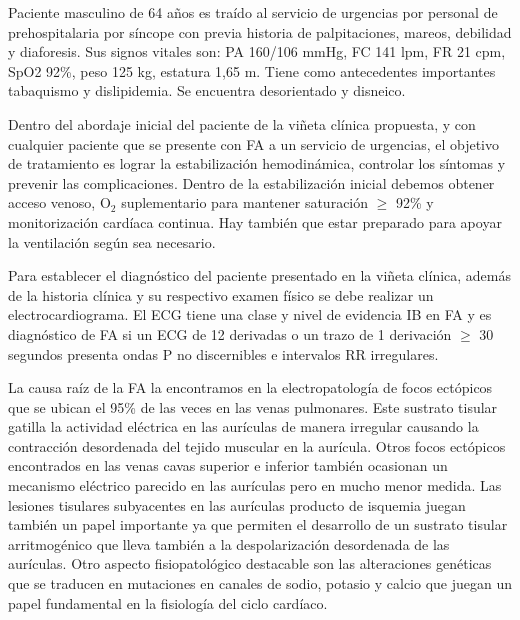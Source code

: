 \documentclass[a4paper]{article}
\let\cite=\supercite
\begin{document}
\begin{multicols}{3}
\begin{boxClinica}

Paciente masculino de 64 años es traído al servicio de urgencias por personal
de prehospitalaria por síncope con previa historia de palpitaciones, mareos,
debilidad y diaforesis. Sus signos vitales son: PA 160/106 mmHg, FC 141 lpm,
FR 21 cpm, SpO2 92\%, peso 125 kg, estatura 1,65 m. Tiene como antecedentes
importantes tabaquismo y dislipidemia. Se encuentra desorientado y disneico.

\end{boxClinica}

Dentro del abordaje inicial del paciente de la viñeta clínica propuesta, y con
cualquier paciente que se presente con FA a un servicio de urgencias,
el objetivo de tratamiento es lograr la estabilización hemodinámica,
controlar los síntomas y prevenir las complicaciones. Dentro de la
estabilización inicial debemos obtener acceso venoso, O$_{\text{2}}$
suplementario para mantener saturación $\geq$ 92\% y monitorización cardíaca
continua. Hay también que estar preparado para apoyar la ventilación según
sea necesario.

Para establecer el diagnóstico del paciente presentado en la viñeta clínica,
además de la historia clínica y su respectivo examen físico se debe realizar un
electrocardiograma. El ECG tiene una clase y nivel de evidencia IB en FA y es
diagnóstico de FA si un ECG de 12 derivadas o un trazo de 1 derivación
$\geq$ 30 segundos presenta ondas P no discernibles e intervalos RR
irregulares\cite{guiaesc_2021}.

La causa raíz de la FA la encontramos en la electropatología de focos ectópicos
que se ubican el 95\% de las veces en las venas pulmonares. Este sustrato
tisular gatilla la actividad eléctrica en las aurículas de manera irregular
causando la contracción desordenada del tejido muscular en la aurícula. Otros
focos ectópicos encontrados en las venas cavas superior e inferior también
ocasionan un mecanismo eléctrico parecido en las aurículas pero en mucho menor
medida. Las lesiones tisulares subyacentes en las aurículas producto de
isquemia juegan también un papel importante ya que permiten el desarrollo de un
sustrato tisular arritmogénico que lleva también a la despolarización
desordenada de las aurículas. Otro aspecto fisiopatológico destacable son las
alteraciones genéticas que se traducen en mutaciones en canales de sodio,
potasio y calcio que juegan un papel fundamental en la fisiología del ciclo
cardíaco\cite{brundel_atrial_2022}.


\end{multicols}
\end{document}
